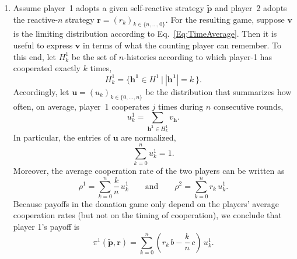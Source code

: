 \documentclass[11pt]{article}
\theoremstyle{plainCl1}
\theoremstyle{plainCl2}
\begin{document}
\begin{enumerate}
\item Assume player~1 adopts a given self-reactive strategy $\mathbf{\tilde p}$ and player~2 adopts the reactive-$n$ strategy $\mathbf{r}\!=\!(r_k)_{k\in\{n,\ldots,0\}}$. For the resulting game, suppose $\mathbf{v}$ is the limiting distribution according to Eq.~\eqref{Eq:TimeAverage}. 
Then it is useful to express $\mathbf{v}$ in terms of what the counting player can remember. To this end, let $H^1_k$ be the set of $n$-histories according to which player-1 has cooperated exactly $k$ times,
\begin{equation}
H^1_k = \Big\{ \mathbf{h^1} \!\in\! H^1~\Big|~|\mathbf{h^1}|\!=\!k~\Big\}.
\end{equation}
Accordingly, let $\mathbf{u}\!=\!(u_k)_{k\in\{0,\ldots,n\}}$ be the distribution that summarizes how often, on average, player~1 cooperates $j$ times during $n$ consecutive rounds, 
\begin{equation}
u^1_k = \sum_{\mathbf{h^1} \in H^1_k} v_\mathbf{h}.
\end{equation}
In particular, the entries of $\mathbf{u}$ are normalized, 
\begin{equation} \label{Eq:uNormalized}
\sum_{k=0}^n u^1_k = 1. 
\end{equation}
Moreover, the average cooperation rate of the two players can be written as
\begin{equation}
\rho^1 = \sum_{k=0}^n \frac{k}{n}\,u^1_k \qquad \text{and} \qquad \rho^2 = \sum_{k=0}^n r_k\,u^1_k.
\end{equation}
Because payoffs in the donation game only depend on the players' average cooperation rates (but not on the timing of cooperation), we conclude that player 1's payoff is
\begin{equation} \label{Eq:CountingDeviationPayoff}
\pi^1(\mathbf{\tilde p},\mathbf{r}) = \sum_{k=0}^n  (r_k\,b - \frac{k}{n}\,c) \,u^1_k.
\end{equation}


\end{enumerate}
\end{document}
